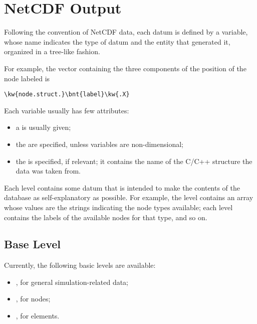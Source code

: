 \section{NetCDF Output}

Following the convention of NetCDF data, each datum is defined
by a variable, whose name indicates the type of datum and the entity
that generated it, organized in a tree-like fashion.

For example, the vector containing the three components 
of the position of the  node labeled  is
\begin{Verbatim}[commandchars=\\\{\}]
    \kw{node.struct.}\bnt{label}\kw{.X}
\end{Verbatim}
Each variable usually has few attributes:
\begin{itemize}
\item a  is usually given;
\item the  are specified, unless variables are non-dimensional;
\item the  is specified, if relevant;
it contains the name of the C/C++ structure the data was taken from.
\end{itemize}

Each level contains some datum that is intended to make the contents
of the database as self-explanatory as possible.
For example, the level  contains an array whose values
are the strings indicating the node types available;
each level  contains the labels of the available nodes
for that type, and so on.



\subsection{Base Level}
Currently, the following basic levels are available:
\begin{itemize}
\item {}, for general simulation-related data;
\item {}, for nodes;
\item {}, for elements.
\end{itemize}



